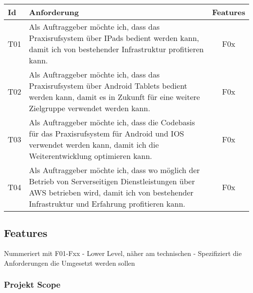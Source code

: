\begin{table}[h]
    \centering
    \begin{tabular}{|l|p{13cm}|c|}
        \hline
        \textbf{Id} & \textbf{Anforderung}                                                              & \textbf{Features} \\
        \hline
        T01         & Als Auftraggeber möchte ich, dass das Praxisrufsystem über IPads bedient werden kann, damit ich von bestehender Infrastruktur profitieren kann. & F0x \\
        \hline
        T02         & Als Auftraggeber möchte ich, dass das Praxisrufsystem über Android Tablets bedient werden kann, damit es in Zukunft für eine weitere Zielgruppe verwendet werden kann. & F0x \\
        \hline
        T03         & Als Auftraggeber möchte ich, dass die Codebasis für das Praxisrufsystem für Android und IOS verwendet werden kann, damit ich die Weiterentwicklung optimieren kann. & F0x \\
        \hline
        T04         & Als Auftraggeber möchte ich, dass wo möglich der Betrieb von Serverseitigen Dienstleistungen über AWS betrieben wird, damit ich von bestehender Infrastruktur und Erfahrung profitieren kann. & F0x               \\
        \hline
    \end{tabular}\label{tab:userstories3}
\end{table}


\clearpage

\subsection{Features}\label{subsec:features}

Nummeriert mit F01-Fxx - Lower Level, näher am technischen - Spezifiziert die Anforderungen die Umgesetzt werden sollen

\subsubsection*{Projekt Scope}



